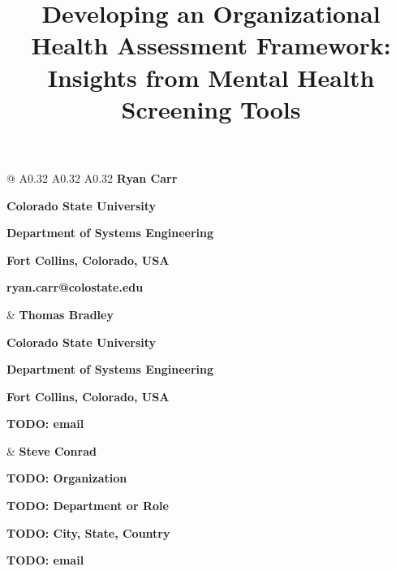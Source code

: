 \documentclass[11pt,letterpaper]{article}
\author{\mbox{}}
\date{}
\title{Developing an Organizational Health Assessment Framework:\\Insights from Mental Health Screening Tools}
\newcommand{\headingfont}{\sffamily}
\newcommand{\authorcard}[5]{%
  {\headingfont\bfseries\fontsize{12pt}{14pt}\selectfont #1}\par
  {\headingfont\bfseries\fontsize{12pt}{14pt}\selectfont #2}\par
  {\headingfont\bfseries\fontsize{12pt}{14pt}\selectfont #3}\par
  {\headingfont\bfseries\fontsize{12pt}{14pt}\selectfont #4}\par
  {\headingfont\bfseries\fontsize{12pt}{14pt}\selectfont #5}\par
}
\begin{document}
\maketitle
\thispagestyle{firstpage}

\noindent
\begin{tabular*}{\textwidth}{@{\extracolsep{\fill}} A{0.32\textwidth} A{0.32\textwidth} A{0.32\textwidth}}
  \authorcard{Ryan Carr}{Colorado State University}{Department of Systems Engineering}{Fort Collins, Colorado, USA}{ryan.carr@colostate.edu} &
  \authorcard{Thomas Bradley}{Colorado State University}{Department of Systems Engineering}{Fort Collins, Colorado, USA}{TODO: email} &
  \authorcard{Steve Conrad}{TODO: Organization}{TODO: Department or Role}{TODO: City, State, Country}{TODO: email}
\end{tabular*}
\addvspace{.75in}
\end{document}
